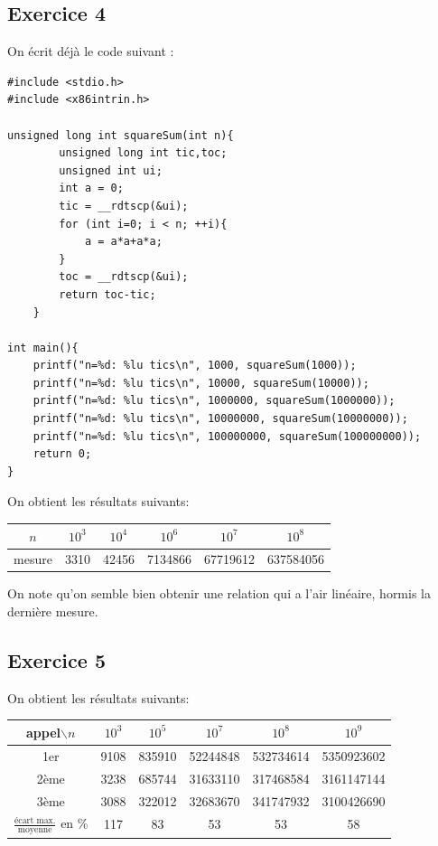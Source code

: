 \documentclass[11pt, a4 paper]{article}
\begin{document}
\subsection{Exercice 4}
On écrit déjà le code suivant :
\begin{lstlisting}[style=CStyle]
#include <stdio.h>
#include <x86intrin.h>

unsigned long int squareSum(int n){
        unsigned long int tic,toc;
        unsigned int ui;
        int a = 0;
        tic = __rdtscp(&ui);
        for (int i=0; i < n; ++i){
            a = a*a+a*a;
        }
        toc = __rdtscp(&ui);
        return toc-tic;
    }

int main(){
    printf("n=%d: %lu tics\n", 1000, squareSum(1000));
    printf("n=%d: %lu tics\n", 10000, squareSum(10000));
    printf("n=%d: %lu tics\n", 1000000, squareSum(1000000));
    printf("n=%d: %lu tics\n", 10000000, squareSum(10000000));
    printf("n=%d: %lu tics\n", 100000000, squareSum(100000000));
    return 0;
}
\end{lstlisting}
On obtient les résultats suivants:
\begin{center}
    \begin{tabular}{| c || c | c | c | c | c |}
        \hline
    $n$ & $10^3$ & $10^4$ & $10^6$ & $10^7$ & $10^8$ \\
        \hline
    mesure & 3310 & 42456 & 7134866 & 67719612 & 637584056\\ 
     \hline
    \end{tabular}
\end{center}
On note qu'on semble bien obtenir une relation qui a l'air linéaire, hormis la dernière mesure.

\subsection{Exercice 5}
On obtient les résultats suivants:
\begin{center}
    \begin{tabular}{| c | c | c | c | c | c |}
        \hline
    appel$\backslash n$ & $10^3$ & $10^5$ & $10^7$ & $10^8$ & $10^9$ \\
        \hline
        1er & 9108 & 835910 & 52244848 & 532734614 & 5350923602\\ 
        \hline
        2ème & 3238 & 685744 & 31633110 & 317468584 & 3161147144\\ 
        \hline
        3ème & 3088 & 322012 & 32683670 & 341747932 & 3100426690\\ 
        \hline
    $\frac{\text{écart max.}}{\text{moyenne}}$ en \% & 117 & 83 & 53 & 53 & 58\\ 
     \hline
    \end{tabular}
\end{center}
\end{document}
